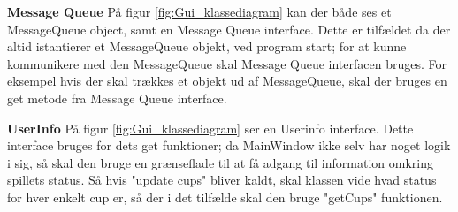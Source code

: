 \documentclass[Softwaredesign/Softwaredesign_main.tex]{subfiles}
\begin{document}
\textbf{Message Queue}
På figur \ref{fig:Gui_klassediagram} kan der både ses et MessageQueue object, samt en Message Queue interface. Dette er tilfældet da der altid istantierer et MessageQueue objekt, ved program start; for at kunne kommunikere med den MessageQueue skal Message Queue interfacen bruges. For eksempel hvis der skal trækkes et objekt ud af MessageQueue, skal der bruges en get metode fra Message Queue interface. 

\textbf{UserInfo}
På figur \ref{fig:Gui_klassediagram} ser en Userinfo interface. Dette interface bruges for dets get funktioner; da MainWindow ikke selv har noget logik i sig, så skal den bruge en grænseflade til at få adgang til information omkring spillets status. Så hvis "update cups" bliver kaldt, skal klassen vide hvad status for hver enkelt cup er, så der i det tilfælde skal den bruge "getCups" funktionen. 
\end{document}
